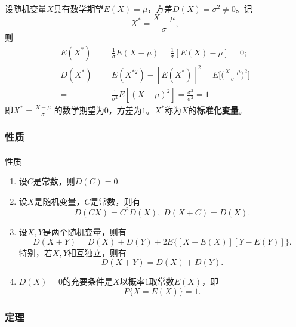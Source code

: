 \paragraph{}
设随机变量$X$具有数学期望$E(X)=\mu$，方差$D(X)=\sigma^2 \neq 0$。记
\begin{equation}
  X^* = \frac{X-\mu}{\sigma},
\end{equation}
则
\begin{align*}
  E(X^*) =&\, \frac{1}{\sigma}E(X-\mu)=\frac{1}{\sigma}[E(X)-\mu] = 0; \\
  D(X^*) =&\, E(X^{*2}) - [E(X^*)]^2 = E\Big[\Big(\frac{X-\mu}{\sigma}\Big)^2\Big] \\
         =&\, \frac{1}{\sigma^2}E[(X-\mu)^2]=\frac{\sigma^2}{\sigma^2} = 1
\end{align*}
即$\displaystyle X^* = \frac{X-\mu}{\sigma}$ 的数学期望为$0$，方差为$1$。$X^*$称为$X$的\textbf{标准化变量}。

\subsubsection{性质}
\paragraph{}
性质
\begin{enumerate}
  \item 设$C$是常数，则$D(C)=0$.
  \item 设$X$是随机变量，$C$是常数，则有
  \begin{equation*}
    D(CX) = C^2D(X), \; D(X+C)=D(X).
  \end{equation*}
  \item 设$X,Y$是两个随机变量，则有
  \begin{equation}
    \label{方差性质3}
    D(X+Y) = D(X) + D(Y) + 2E\{[X-E(X)][Y-E(Y)]\}.
  \end{equation}
  特别，若$X,Y$相互独立，则有
  \begin{equation}
    D(X+Y) = D(X) + D(Y).
  \end{equation}
  \item $D(X)=0$的充要条件是$X$以概率$1$取常数$E(X)$，即
  \begin{equation*}
    P\{X=E(X)\} = 1.
  \end{equation*}
\end{enumerate}

\subsubsection{定理}
